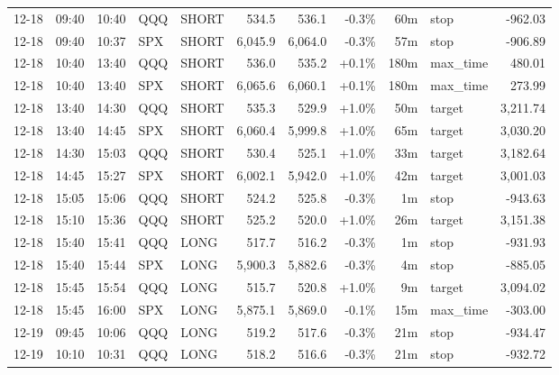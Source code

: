 \documentclass[11pt,a4paper,twoside]{article}
\begin{document}
\begin{center}
\begin{longtable}{>{\color{txtmain}}l l l l l r r r r >{\color{txtmain}}l r}
12-18 & 09:40 & 10:40 & QQQ & SHORT & 534.5 & 536.1 & \textcolor{lossred}{-0.3\%} & 60m & stop & \textcolor{lossred}{-962.03} \\
12-18 & 09:40 & 10:37 & SPX & SHORT & 6,045.9 & 6,064.0 & \textcolor{lossred}{-0.3\%} & 57m & stop & \textcolor{lossred}{-906.89} \\
12-18 & 10:40 & 13:40 & QQQ & SHORT & 536.0 & 535.2 & \textcolor{wingreen}{+0.1\%} & 180m & max\_time & \textcolor{wingreen}{480.01} \\
12-18 & 10:40 & 13:40 & SPX & SHORT & 6,065.6 & 6,060.1 & \textcolor{wingreen}{+0.1\%} & 180m & max\_time & \textcolor{wingreen}{273.99} \\
12-18 & 13:40 & 14:30 & QQQ & SHORT & 535.3 & 529.9 & \textcolor{wingreen}{+1.0\%} & 50m & target & \textcolor{wingreen}{3,211.74} \\
12-18 & 13:40 & 14:45 & SPX & SHORT & 6,060.4 & 5,999.8 & \textcolor{wingreen}{+1.0\%} & 65m & target & \textcolor{wingreen}{3,030.20} \\
12-18 & 14:30 & 15:03 & QQQ & SHORT & 530.4 & 525.1 & \textcolor{wingreen}{+1.0\%} & 33m & target & \textcolor{wingreen}{3,182.64} \\
12-18 & 14:45 & 15:27 & SPX & SHORT & 6,002.1 & 5,942.0 & \textcolor{wingreen}{+1.0\%} & 42m & target & \textcolor{wingreen}{3,001.03} \\
12-18 & 15:05 & 15:06 & QQQ & SHORT & 524.2 & 525.8 & \textcolor{lossred}{-0.3\%} & 1m & stop & \textcolor{lossred}{-943.63} \\
12-18 & 15:10 & 15:36 & QQQ & SHORT & 525.2 & 520.0 & \textcolor{wingreen}{+1.0\%} & 26m & target & \textcolor{wingreen}{3,151.38} \\
12-18 & 15:40 & 15:41 & QQQ & LONG & 517.7 & 516.2 & \textcolor{lossred}{-0.3\%} & 1m & stop & \textcolor{lossred}{-931.93} \\
12-18 & 15:40 & 15:44 & SPX & LONG & 5,900.3 & 5,882.6 & \textcolor{lossred}{-0.3\%} & 4m & stop & \textcolor{lossred}{-885.05} \\
12-18 & 15:45 & 15:54 & QQQ & LONG & 515.7 & 520.8 & \textcolor{wingreen}{+1.0\%} & 9m & target & \textcolor{wingreen}{3,094.02} \\
12-18 & 15:45 & 16:00 & SPX & LONG & 5,875.1 & 5,869.0 & \textcolor{lossred}{-0.1\%} & 15m & max\_time & \textcolor{lossred}{-303.00} \\
12-19 & 09:45 & 10:06 & QQQ & LONG & 519.2 & 517.6 & \textcolor{lossred}{-0.3\%} & 21m & stop & \textcolor{lossred}{-934.47} \\
12-19 & 10:10 & 10:31 & QQQ & LONG & 518.2 & 516.6 & \textcolor{lossred}{-0.3\%} & 21m & stop & \textcolor{lossred}{-932.72} \\

\end{longtable}
\end{center}
\end{document}
